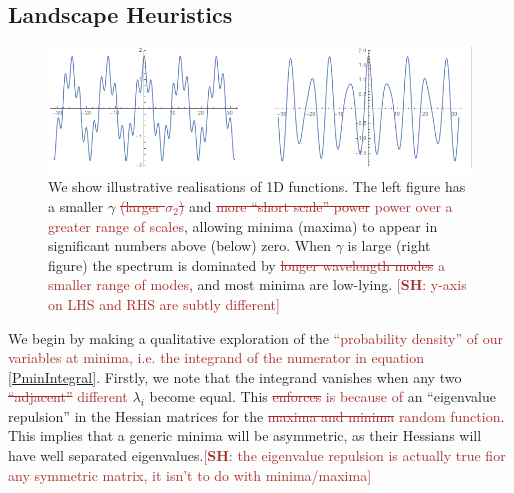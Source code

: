 \documentclass[12pt]{article}
\newcommand{\SH}[1]{\textcolor{brown}{[{\bf SH}: #1]}}
\newcommand{\sh}[1]{\textcolor{brown}{#1}}
\begin{document}



\subsection{Landscape Heuristics}
\begin{figure}
  \centering
  
  \includegraphics[width=\linewidth]{TwoSigmas.png}
  \caption{We show illustrative realisations of 1D functions. The left figure has a smaller $\gamma$ \sh{\sout{(larger $\sigma_2$)}} and \sh{\sout{more “short scale” power} power over a greater range of scales}, allowing minima (maxima) to appear in significant numbers above (below) zero. When $\gamma$ is large (right figure) the spectrum is dominated by \sh{\sout{longer wavelength modes} a smaller range of modes}, and most minima are low-lying. \SH{y-axis on LHS and RHS are subtly different}}
  \label{examples1}
\end{figure}

We begin by making a qualitative exploration of the \sh{``probability density'' of our variables at minima, i.e. the integrand of the numerator in equation \eqref{PminIntegral}}. Firstly, we note that the integrand vanishes when any two \sh{\sout{``adjacent''} different} $\lambda_i$ become equal. This \sh{\sout{enforces} is because of} an ``eigenvalue repulsion'' in the Hessian matrices for the \sh{\sout{maxima and minima} random function}. This implies that a generic minima will be asymmetric, as their Hessians will have well separated eigenvalues.\SH{the eigenvalue repulsion is actually true fior any symmetric matrix, it isn't to do with minima/maxima}
\end{document}
